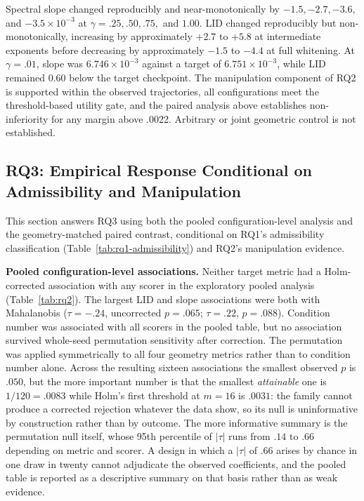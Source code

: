 \documentclass[11pt,a4paper]{article}
\begin{document}
Spectral slope changed reproducibly and near-monotonically by $-1.5,-2.7,-3.6,$ and $-3.5\times10^{-3}$ at $\gamma=.25,.50,.75,$ and $1.00$. LID changed reproducibly but non-monotonically, increasing by approximately $+2.7$ to $+5.8$ at intermediate exponents before decreasing by approximately $-1.5$ to $-4.4$ at full whitening. At $\gamma=.01$, slope was $6.746\times10^{-3}$ against a target of $6.751\times10^{-3}$, while LID remained 0.60 below the target checkpoint. The manipulation component of RQ2 is supported within the observed trajectories, all configurations meet the threshold-based utility gate, and the paired analysis above establishes non-inferiority for any margin above .0022. Arbitrary or joint geometric control is not established.

\subsection{RQ3: Empirical Response Conditional on Admissibility and Manipulation}
This section answers RQ3 using both the pooled configuration-level analysis and the geometry-matched paired contrast, conditional on RQ1's admissibility classification (Table~\ref{tab:rq1-admissibility}) and RQ2's manipulation evidence.

\textbf{Pooled configuration-level associations.} Neither target metric had a Holm-corrected association with any scorer in the exploratory pooled analysis (Table~\ref{tab:rq2}). The largest LID and slope associations were both with Mahalanobis ($\tau=-.24$, uncorrected $p=.065$; $\tau=.22$, $p=.088$). Condition number was associated with all scorers in the pooled table, but no association survived whole-seed permutation sensitivity after correction. The permutation was applied symmetrically to all four geometry metrics rather than to condition number alone. Across the resulting sixteen associations the smallest observed $p$ is $.050$, but the more important number is that the smallest \emph{attainable} one is $1/120=.0083$ while Holm's first threshold at $m=16$ is $.0031$: the family cannot produce a corrected rejection whatever the data show, so its null is uninformative by construction rather than by outcome. The more informative summary is the permutation null itself, whose 95th percentile of $|\tau|$ runs from $.14$ to $.66$ depending on metric and scorer. A design in which a $|\tau|$ of $.66$ arises by chance in one draw in twenty cannot adjudicate the observed coefficients, and the pooled table is reported as a descriptive summary on that basis rather than as weak evidence.
\end{document}
